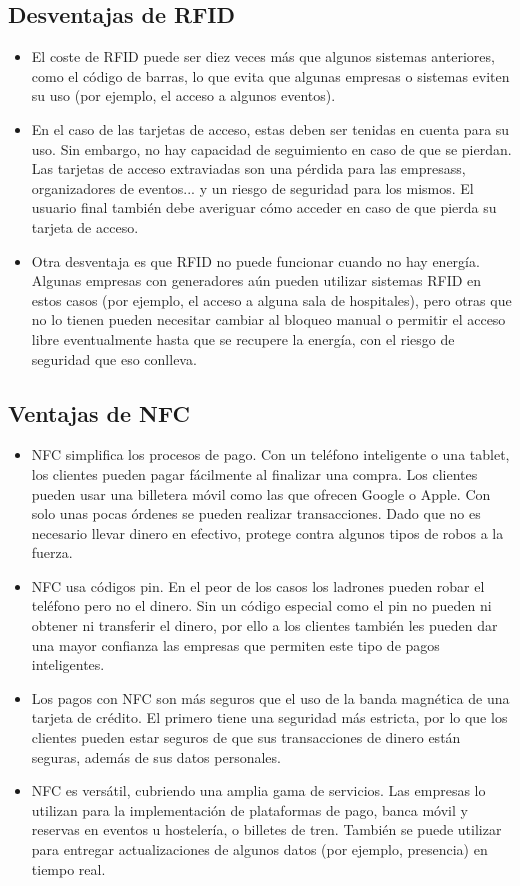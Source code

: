 \documentclass[12pt,a4paper,onecolumn,oneside]{report}
\begin{document}
\subsection{Desventajas de RFID}
\begin{itemize}
\item El coste de RFID puede ser diez veces más que algunos sistemas anteriores, como el código de barras, lo que evita que algunas empresas o sistemas eviten su uso (por ejemplo, el acceso a algunos eventos). 
\item En el caso de las tarjetas de acceso, estas deben ser tenidas en cuenta para su uso. Sin embargo, no hay capacidad de seguimiento en caso de que se pierdan. Las tarjetas de acceso extraviadas son una pérdida para las empresass, organizadores de eventos... y un riesgo de seguridad para los mismos. El usuario final también debe averiguar cómo acceder en caso de que pierda su tarjeta de acceso.
\item Otra desventaja es que RFID no puede funcionar cuando no hay energía. Algunas empresas con generadores aún pueden utilizar sistemas RFID en estos casos (por ejemplo, el acceso a alguna sala de hospitales), pero otras que no lo tienen pueden necesitar cambiar al bloqueo manual o permitir el acceso libre eventualmente hasta que se recupere la energía, con el riesgo de seguridad que eso conlleva.
\end{itemize}

\subsection{Ventajas de NFC}
\begin{itemize}
\item NFC simplifica los procesos de pago. Con un teléfono inteligente o una tablet, los clientes pueden pagar fácilmente al finalizar una compra. Los clientes pueden usar una billetera móvil como las que ofrecen Google o Apple. Con solo unas pocas órdenes se pueden realizar transacciones. Dado que no es necesario llevar dinero en efectivo, protege contra algunos tipos de robos a la fuerza.
\item NFC usa códigos pin. En el peor de los casos los ladrones pueden robar el teléfono pero no el dinero. Sin un código especial como el pin no pueden ni obtener ni transferir el dinero, por ello a los clientes también les pueden dar una mayor confianza las empresas que permiten este tipo de pagos inteligentes.
\item Los pagos con NFC son más seguros que el uso de la banda magnética de una tarjeta de crédito. El primero tiene una seguridad más estricta, por lo que los clientes pueden estar seguros de que sus transacciones de dinero están seguras, además de sus datos personales.
\item NFC es versátil, cubriendo una amplia gama de servicios. Las empresas lo utilizan para la implementación de plataformas de pago, banca móvil y reservas en eventos u hostelería, o billetes de tren. También se puede utilizar para entregar actualizaciones de algunos datos (por ejemplo, presencia) en tiempo real.
\end{itemize}
\end{document}
